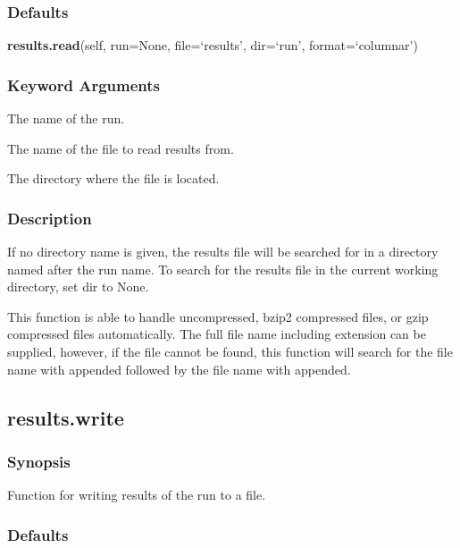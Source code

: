   
 \subsubsection{Defaults} 

 \textsf{\textbf{results.read}(self, run=None, file=`results', dir=`run', format=`columnar')} 

  
 \subsubsection{Keyword Arguments} 

   The name of the run.   

   The name of the file to read results from.   

   The directory where the file is located.  

  

  
 \subsubsection{Description} 

 If no directory name is given, the results file will be searched for in a directory named after the run name.  To search for the results file in the current working directory, set dir to None. 
  

 This function is able to handle uncompressed, bzip2 compressed files, or gzip compressed files automatically.  The full file name including extension can be supplied, however, if the file cannot be found, this function will search for the file name with  appended followed by the file name with  appended. 
  

  

 \newpage 

 \subsection{results.write} 

  
 \subsubsection{Synopsis} 

 Function for writing results of the run to a file. 
  

  
 \subsubsection{Defaults} 

